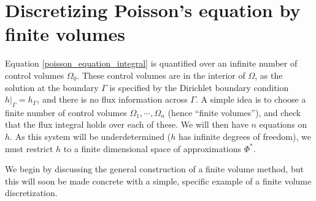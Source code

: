 
% 



\section{Discretizing Poisson's equation by finite volumes}\label{discretizing_poisson}
Equation \eqref{poisson_equation_integral} is quantified over an infinite number of control volumes $\Omega_0$.
These control volumes are in the interior of $\Omega$, as the solution at the boundary $\Gamma$ is specified by the Dirichlet boundary condition
$\left.h\right|_\Gamma = h_\Gamma$, and there is no flux information across $\Gamma$.
A simple idea is to choose a finite number of control volumes $\Omega_1,\cdots,\Omega_n$ (hence ``finite volumes''), and check that the flux integral holds over each of these.
We will then have $n$ equations on $h$. As this system will be underdetermined ($h$ has infinite degrees of freedom), we must
restrict $h$ to a finite dimensional space of approximations $\Phi^*$.

We begin by discussing the general construction of a finite volume method, but this will soon be made concrete with a simple, specific example of a 
finite volume discretization.


